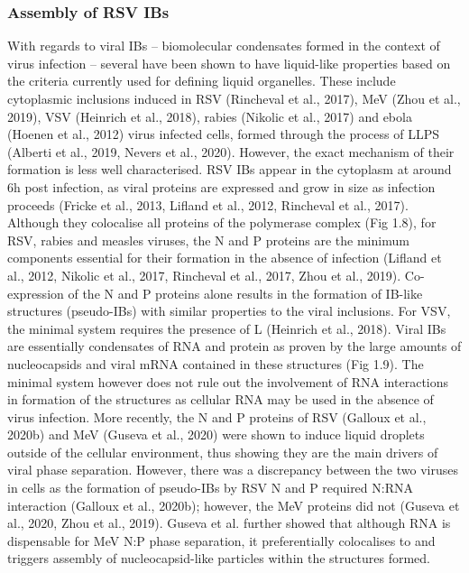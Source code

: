 \subsubsection{Assembly of RSV IBs} \label{Assembly of RSV IBs}
With regards to viral IBs – biomolecular condensates formed in the context of virus infection – several have been shown to have liquid-like properties based on the criteria currently used for defining liquid organelles. These include cytoplasmic inclusions induced in RSV (Rincheval et al., 2017), MeV (Zhou et al., 2019), VSV (Heinrich et al., 2018), rabies (Nikolic et al., 2017) and ebola (Hoenen et al., 2012) virus infected cells, formed through the process of LLPS (Alberti et al., 2019, Nevers et al., 2020). However, the exact mechanism of their formation is less well characterised. RSV IBs appear in the cytoplasm at around 6h post infection, as viral proteins are expressed and grow in size as infection proceeds (Fricke et al., 2013, Lifland et al., 2012, Rincheval et al., 2017). Although they colocalise all proteins of the polymerase complex (Fig 1.8), for RSV, rabies and measles viruses, the N and P proteins are the minimum components essential for their formation in the absence of infection (Lifland et al., 2012, Nikolic et al., 2017, Rincheval et al., 2017, Zhou et al., 2019). Co-expression of the N and P proteins alone results in the formation of IB-like structures (pseudo-IBs) with similar properties to the viral inclusions. For VSV, the minimal system requires the presence of L (Heinrich et al., 2018). Viral IBs are essentially condensates of RNA and protein as proven by the large amounts of nucleocapsids and viral mRNA contained in these structures (Fig 1.9). The minimal system however does not rule out the involvement of RNA interactions in formation of the structures as cellular RNA may be used in the absence of virus infection. More recently, the N and P proteins of RSV (Galloux et al., 2020b) and MeV (Guseva et al., 2020) were shown to induce liquid droplets outside of the cellular environment, thus showing they are the main drivers of viral phase separation. However, there was a discrepancy between the two viruses in cells as the formation of pseudo-IBs by RSV N and P required N:RNA interaction (Galloux et al., 2020b); however, the MeV proteins did not (Guseva et al., 2020, Zhou et al., 2019). Guseva et al. further showed that although RNA is dispensable for MeV N:P phase separation, it preferentially colocalises to and triggers assembly of nucleocapsid-like particles within the structures formed.

